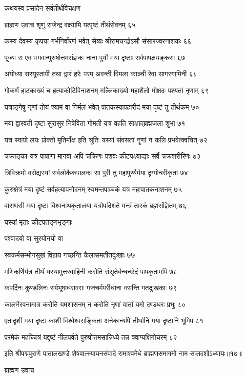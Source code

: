 कथयस्व प्रसादेन सर्वतीर्थविचक्षण

ब्राह्मण उवाच
शृणु राजेन्द्र वक्ष्यामि यत्पृष्टं तीर्थसेवनम् ६५

कस्य देवस्य कृपया गर्भनिर्वारणं भवेत्
सेव्यः श्रीरामचन्द्रोऽसौ संसारज्वरनाशकः ६६

पूज्यः स एव भगवान्पुरुषोत्तमसंज्ञकः
नाना पुर्यो मया दृष्टाः सर्वपापक्षयङ्कराः ६७

अयोध्या सरयूस्तापी तथा द्वारं हरेः परम्
अवन्ती विमला काञ्ची रेवा सागरगामिनी ६८

गोकर्णं हाटकाख्यं च हत्याकोटिविनाशनम्
मल्लिकाख्यो महाशैलो मोक्षदः पश्यतां नृणाम् ६९

यत्राङ्गेषु नृणां तोयं श्यामं वा निर्मलं भवेत्
पातकस्यापहारीदं मया दृष्टं तु तीर्थकम् ७०

मया द्वारवती दृष्टा सुरासुर निषेविता
गोमती यत्र वहति साक्षाद्ब्रह्मजला शुभा ७१

यत्र स्वापो लयः प्रोक्तो मृतिर्मोक्ष इति श्रुतिः
यस्यां संवसतां नॄणां न कलि प्रभवेत्क्वचित् ७२

चक्राङ्का यत्र पाषाणा मानवा अपि चक्रिणः
पशवः कीटपक्ष्याद्याः सर्वे चक्रशरीरिणः ७३

त्रिविक्रमो वसेद्यस्यां सर्वलोकैकपालकः
सा पुरी तु महापुण्यैर्मया दृग्गोचरीकृता ७४

कुरुक्षेत्रं मया दृष्टं सर्वहत्यापनोदनम्
स्यमन्तपञ्चकं यत्र महापातकनाशनम् ७५

वाराणसी मया दृष्टा विश्वनाथकृतालया
यत्रोपदिशते मन्त्रं तारकं ब्रह्मसंज्ञितम् ७६

यस्यां मृताः कीटपतङ्गभृङ्गाः

पश्वादयो वा सुरयोनयो वा

स्वकर्मसम्भोगसुखं विहाय
गच्छन्ति कैलासमतीतदुःखाः ७७

मणिकर्णिर्यत्र तीर्थं यस्यामुत्तरवाहिनी
करोति संसृतेर्बन्धच्छेदं पापकृतामपि ७८

कपर्दिनः कुण्डलिनः सर्पभूषाधरावराः
गजचर्मपरीधाना वसन्ति गतदुःखकाः ७९

कालभैरवनामात्र करोति यमशासनम्
न करोति नृणां वार्तां यमो दण्डधरः प्रभुः ८०

एतादृशी मया दृष्टा काशी विश्वेश्वराङ्किता
अनेकान्यपि तीर्थानि मया दृष्टानि भूमिप ८१

परमेकं महच्चित्रं यद्दृष्टं नीलपर्वते
पुरुषोत्तमसान्निध्ये तन्न क्वाप्यक्षिगोचरम् ८२

इति श्रीपद्मपुराणे पातालखण्डे शेषवात्स्यायनसंवादे रामाश्वमेधे ब्राह्मणसमागमो नाम सप्तदशोऽध्यायः॥१७॥


ब्राह्मण उवाच

